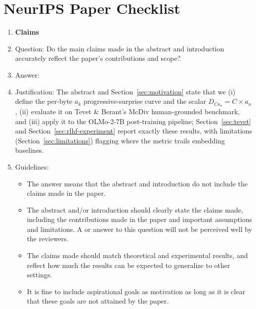 \section*{NeurIPS Paper Checklist}

\begin{enumerate}

\item {\bf Claims}
    \item[] Question: Do the main claims made in the abstract and introduction accurately reflect the paper's contributions and scope?
    \item[] Answer: \answerYes{}
    \item[] Justification: The abstract and Section~\ref{sec:motivation} state that we (i) define the per-byte $a_k$ progressive-surprise curve and the scalar $D_{Ca_n}=C\times a_n$, (ii) evaluate it on Tevet \& Berant's McDiv human-grounded benchmark, and (iii) apply it to the OLMo-2-7B post-training pipeline; Section~\ref{sec:tevet} and Section~\ref{sec:rlhf-experiment} report exactly these results, with limitations (Section~\ref{sec:limitations}) flagging where the metric trails embedding baselines.
    \item[] Guidelines:
    \begin{itemize}
        \item The answer \answerNA{} means that the abstract and introduction do not include the claims made in the paper.
        \item The abstract and/or introduction should clearly state the claims made, including the contributions made in the paper and important assumptions and limitations. A \answerNo{} or \answerNA{} answer to this question will not be perceived well by the reviewers.
        \item The claims made should match theoretical and experimental results, and reflect how much the results can be expected to generalize to other settings.
        \item It is fine to include aspirational goals as motivation as long as it is clear that these goals are not attained by the paper.
    \end{itemize}


\end{enumerate}
